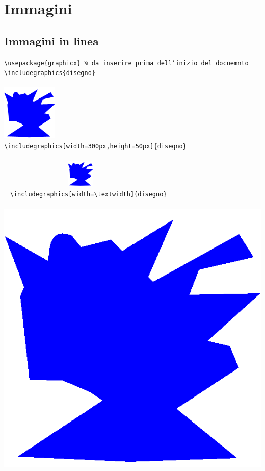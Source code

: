 \section{Immagini}
 \subsection{Immagini in linea}
  \texttt{\textbackslash usepackage\{graphicx\} \% da inserire prima dell'inizio del docuemnto}\\
  \texttt{\textbackslash includegraphics\{disegno\}}\\~\\
  \includegraphics[height=100px]{img/disegno}\\
  \texttt{\textbackslash includegraphics[width=300px,height=50px]\{disegno\}}\\~\\
  \includegraphics[width=300px,height=50px]{img/disegno}~\\~
  \texttt{\textbackslash includegraphics[width=\textbackslash textwidth]\{disegno\}}\\~\\
  \includegraphics[width=\textwidth]{img/disegno}~\\~
